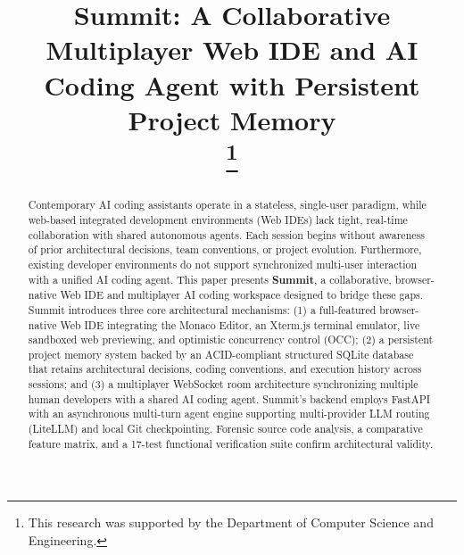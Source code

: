\documentclass[conference]{IEEEtran}
\begin{document}
\title{Summit: A Collaborative Multiplayer Web IDE and AI Coding Agent with Persistent Project Memory\\
\thanks{This research was supported by the Department of Computer Science and Engineering.}
}

\author{
}

\maketitle

\begin{abstract}
Contemporary AI coding assistants operate in a stateless, single-user paradigm, while web-based integrated development environments (Web IDEs) lack tight, real-time collaboration with shared autonomous agents. Each session begins without awareness of prior architectural decisions, team conventions, or project evolution. Furthermore, existing developer environments do not support synchronized multi-user interaction with a unified AI coding agent. This paper presents \textbf{Summit}, a collaborative, browser-native Web IDE and multiplayer AI coding workspace designed to bridge these gaps. Summit introduces three core architectural mechanisms: (1) a full-featured browser-native Web IDE integrating the Monaco Editor, an Xterm.js terminal emulator, live sandboxed web previewing, and optimistic concurrency control (OCC); (2) a persistent project memory system backed by an ACID-compliant structured SQLite database that retains architectural decisions, coding conventions, and execution history across sessions; and (3) a multiplayer WebSocket room architecture synchronizing multiple human developers with a shared AI coding agent. Summit's backend employs FastAPI with an asynchronous multi-turn agent engine supporting multi-provider LLM routing (LiteLLM) and local Git checkpointing. Forensic source code analysis, a comparative feature matrix, and a 17-test functional verification suite confirm architectural validity.
\end{abstract}
\end{document}
